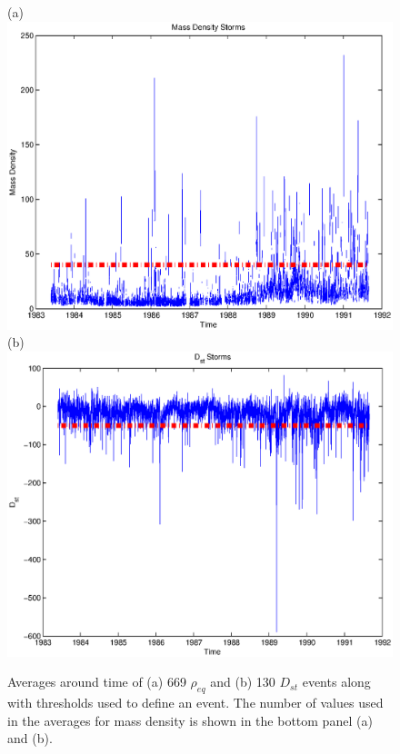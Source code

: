 \documentclass[10pt,twocolumn]{article}
\begin{document}
\begin{figure}[htp]
\centering
(a)
\includegraphics[scale=0.7]{paperfigures/massdensitystorms.eps}
(b)
\includegraphics[scale=0.7]{paperfigures/dststorms.eps}
\caption{Averages around time of (a) 669 $\rho_{eq}$ and (b) 130 $D_{st}$ events along with thresholds used to define an event. The number of values used in the averages for mass density is shown in the bottom panel (a) and (b).}
\label{DSTstorm}
\end{figure}
\clearpage
\end{document}
